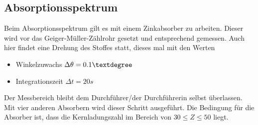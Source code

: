\subsection{Absorptionsspektrum}
Beim Absorptionsspektrum gilt es mit einem Zinkabsorber zu arbeiten. Dieser wird vor das Geiger-Müller-Zählrohr gesetzt 
und entsprechend gemessen. Auch hier findet eine Drehung des Stoffes statt, dieses mal mit den Werten
\begin{itemize}
    \item{Winkelzuwachs $\Delta \theta = 0.1 \textdegree$}
    \item{Integrationszeit $\Delta t = 20 \si{s}$}
\end{itemize}
Der Messbereich bleibt dem Durchführer/der Durchführerin selbst überlassen.\\
Mit vier anderen Absorbern wird dieser Schritt ausgeführt. Die Bedingung für die Absorber ist, dass die Kernladungszahl im Bereich 
von $30 \leq \si{Z} \leq 50 $ liegt.

